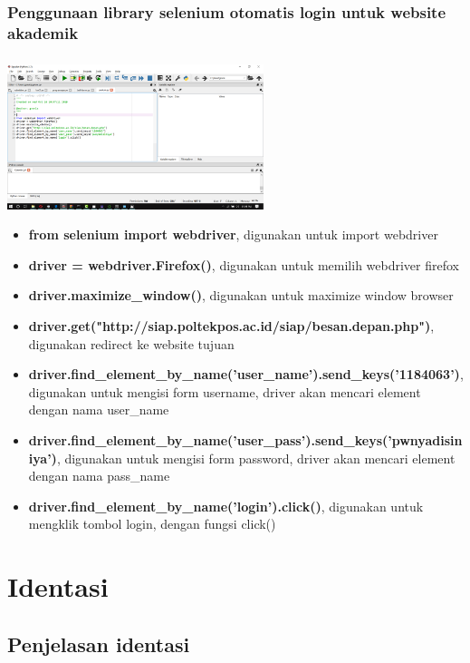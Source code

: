 \documentclass[a4paper,12pt]{report}
\begin{document}
\subsection{Penggunaan library selenium otomatis login untuk website akademik}
\paragraph{}
\includegraphics[width=7.5cm]{gambar/spyder/Screenshot (99).png} 
\begin{itemize}
	\item \textbf{from selenium import webdriver}, digunakan untuk import webdriver
	\item \textbf{driver = webdriver.Firefox()}, digunakan untuk memilih webdriver firefox
	\item \textbf{driver.maximize\_window()}, digunakan untuk maximize window browser
	\item \textbf{driver.get("http://siap.poltekpos.ac.id/siap/besan.depan.php")}, digunakan redirect ke website tujuan
	\item \textbf{driver.find\_element\_by\_name('user\_name').send\_keys('1184063')}, digunakan untuk mengisi form username, driver akan mencari element dengan nama user\_name
	\item \textbf{driver.find\_element\_by\_name('user\_pass').send\_keys('pwnyadisiniya')}, digunakan untuk mengisi form password, driver akan mencari element dengan nama pass\_name
	\item \textbf{driver.find\_element\_by\_name('login').click()}, digunakan untuk mengklik tombol login, dengan fungsi click()
\end{itemize}
\chapter{Identasi}
\section{Penjelasan identasi}
\end{document}
